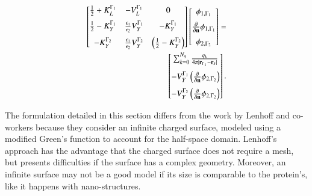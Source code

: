  \begin{align} \label{eq:matrix_dphi}
 \left[
    \begin{matrix} %
       \frac{1}{2} + K_{L}^{\Gamma_1} & -V_{L}^{\Gamma_1} & 0 \vspace{0.2cm}\\
       \frac{1}{2} - K_{Y}^{\Gamma_1} &  \frac{\epsilon_1}{\epsilon_2} V_{Y}^{\Gamma_1} & -K_{Y}^{\Gamma_1} \vspace{0.2cm} \\
       - K_{Y}^{\Gamma_2} & \frac{\epsilon_1}{\epsilon_2} V_{Y}^{\Gamma_2} & \left(\frac{1}{2} - K_{Y}^{\Gamma_2}\right) \\
    \end{matrix}
    \right] \left[ 
    \begin{matrix} %
       \phi_{1,\Gamma_1} \vspace{0.2cm} \\
       \frac{\partial}{\partial \mathbf{n}} \phi_{1,\Gamma_1} \vspace{0.2cm}\\
       \phi_{2,\Gamma_2}\\
    \end{matrix} 
     \right] =   \nonumber \\
    \left[
    \begin{matrix} %
       \sum_{k=0}^{N_q} \frac{q_k}{4\pi|\mathbf{r}_{\Gamma_1} - \mathbf{r}_k|} \vspace{0.2cm} \\
        -V_{Y}^{\Gamma_1} \left( \frac{\partial}{\partial \mathbf{n}} \phi_{2,\Gamma_2} \right) \vspace{0.2cm} \\
        -V_{Y}^{\Gamma_2} \left( \frac{\partial}{\partial \mathbf{n}} \phi_{2,\Gamma_2} \right)
    \end{matrix}
    \right].
 \end{align}
 

The formulation detailed in this section differs from the work by Lenhoff and co-workers \cite{YoonLenhoff1992,RothLenhoff1993} because they consider an infinite charged surface, modeled using a modified Green's function to account for the half-space domain. Lenhoff's approach has the advantage that the charged surface does not require a mesh, but presents difficulties if the surface has a complex geometry. Moreover, an infinite surface may not be a good model if its size is comparable to the protein's, like it happens with nano-structures.

